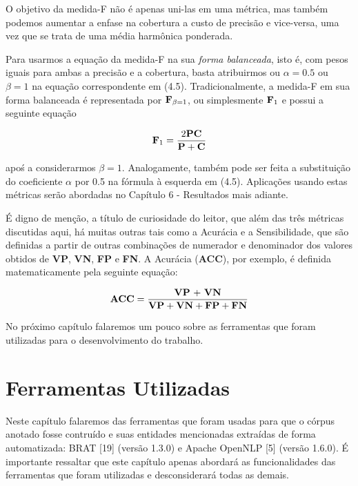 \documentclass[11pt]{report}
\begin{document}
O objetivo da medida-F não é apenas uni-las em uma métrica, mas também podemos aumentar a enfase na cobertura a custo de precisão e vice-versa, uma vez que se trata de uma média harmônica ponderada.

Para usarmos a equação da medida-F na sua \textit{forma balanceada}, isto é, com pesos iguais para ambas a precisão e a cobertura, basta atribuirmos ou $\alpha = 0.5$ ou  $\beta = 1$ na equação correspondente em (4.5). Tradicionalmente, a medida-F em sua forma balanceada é representada por $\text{\textbf{F}}_{\beta = 1}$, ou simplesmente $\text{\textbf{F}}_{1}$ e possui
a seguinte equação

\begin{equation}
 \text{\textbf{F}}_1 = \dfrac{2\text{\textbf{PC}}}{\text{\textbf{P}} + \text{\textbf{C}}}
\end{equation}

apoś a considerarmos $\beta = 1$. Analogamente, também pode ser feita a substituição do coeficiente $\alpha$ por 0.5 na fórmula à esquerda em (4.5).
Aplicações usando estas métricas serão abordadas no Capítulo 6 - Resultados mais adiante.

É digno de menção, a título de curiosidade do leitor, que além das três métricas discutidas aqui, há muitas outras tais como a Acurácia e a Sensibilidade, que são definidas
a partir de outras combinações de numerador e denominador dos valores obtidos de \textbf{VP}, \textbf{VN}, \textbf{FP} e \textbf{FN}. A Acurácia (\textbf{ACC}), por exemplo, é
definida matematicamente pela seguinte equação:

\begin{equation}
 \text{\textbf{ACC}} = \dfrac{\text{\textbf{VP} + \textbf{VN}}}{\text{\textbf{VP}} + \text{\textbf{VN}} + \text{\textbf{FP}} + \text{\textbf{FN}}}
\end{equation}

No próximo capítulo falaremos um pouco sobre as ferramentas que foram utilizadas para o desenvolvimento do trabalho.

\pagebreak
\chapter{Ferramentas Utilizadas}

\indent\indent Neste capítulo falaremos das ferramentas que foram usadas para que o córpus anotado fosse contruído e suas entidades mencionadas extraídas
de forma automatizada: BRAT [19] (versão 1.3.0) e Apache OpenNLP [5] (versão 1.6.0). É importante ressaltar que este capítulo apenas abordará as funcionalidades das ferramentas que foram utilizadas e desconsiderará todas as
demais.
\end{document}
